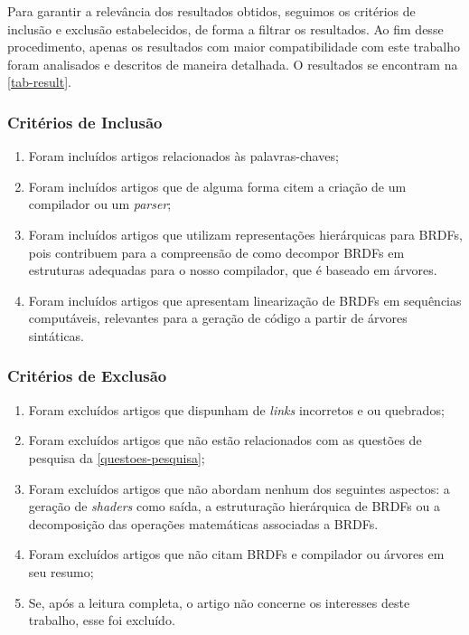 Para garantir a relevância dos resultados obtidos, seguimos os critérios de inclusão e exclusão estabelecidos, de forma a filtrar os resultados. Ao fim desse procedimento, apenas os resultados com maior compatibilidade com este trabalho foram analisados e descritos de maneira detalhada. O resultados se encontram na \autoref{tab-result}.


\subsubsection{Critérios de Inclusão}


\begin{enumerate}
  \item Foram incluídos artigos relacionados às palavras-chaves;

  \item Foram incluídos artigos que de alguma forma citem a criação de um compilador ou um \textit{parser};

  \item Foram incluídos artigos que utilizam representações hierárquicas para BRDFs, pois contribuem para a compreensão de como decompor BRDFs em estruturas adequadas para o nosso compilador, que é baseado em árvores.

  \item Foram incluídos artigos que apresentam linearização de BRDFs em sequências computáveis, relevantes para a geração de código a partir de árvores sintáticas.
\end{enumerate}


\subsubsection{Critérios de Exclusão}


\begin{enumerate}
  \item Foram excluídos artigos que dispunham de \textit{links} incorretos e ou quebrados;
  \item Foram excluídos artigos que não estão relacionados com as questões de pesquisa da \autoref{questoes-pesquisa};
  \item Foram excluídos artigos que não abordam nenhum dos seguintes aspectos: a geração de \textit{shaders} como saída, a estruturação hierárquica de BRDFs ou a decomposição das operações matemáticas associadas a BRDFs.

  \item Foram excluídos artigos que não citam BRDFs e compilador ou árvores em seu resumo;
  \item Se, após a leitura completa, o artigo não concerne os interesses deste trabalho, esse foi excluído.
\end{enumerate}




